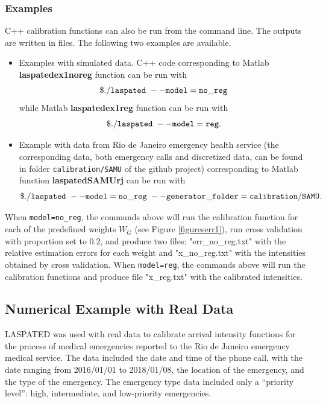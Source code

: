 \documentclass[article]{jss}
\begin{document}
{\begin{lstlisting}[label={list:13},caption=Cross validation in C++]
\end{lstlisting}



\subsubsection{Examples}

 C++ calibration functions can also be run from the command line. The outputs are written in files. The following two examples are available.

\begin{itemize}
    \item Examples with simulated data. C++ code corresponding to 
    Matlab \textbf{laspatedex1noreg} function can be run with
    $$
    {\tt{\$./laspated\text{ }--model=no\_reg}}
    $$
    while 
    Matlab \textbf{laspatedex1reg} function can be run with
    $$
    {\tt{\$./laspated\text{ }--model=reg.}}
    $$
    \item Example with data from Rio de Janeiro emergency health service (the corresponding
    data, both emergency calls and discretized
    data, can be found in folder {\tt{calibration/SAMU}} of the github project)
    corresponding to Matlab function 
    {\textbf{laspatedSAMUrj}} can be run
    with
    $$
    {\tt{\$./laspated\text{ }--model=no\_reg\text{ }--generator\_folder=calibration/SAMU}}.
    $$
\end{itemize}

When {\tt{model=no\_reg}}, the commands above will run the calibration function for each of the predefined weights  \(W_G\) (see Figure \ref{figureserr1}), run cross validation with proportion set to 0.2, and produce two files: "err\_no\_reg.txt" with the relative estimation errors for each weight and "x\_no\_reg.txt" with the intensities obtained by cross validation. When {\tt{model=reg}}, the commands above will run the calibration functions and produce  file "x\_reg.txt" with the calibrated intensities.
}


\subsection{Numerical Example with Real Data}
\label{sec:case-study}

LASPATED was used with real data to calibrate arrival intensity functions for the process of medical emergencies reported to the Rio de Janeiro emergency medical service.
The data included the date and time of the phone call, with the date ranging from 2016/01/01 to 2018/01/08, the location of the emergency, and the type of the emergency.
The emergency type data included only a ``priority level'': high, intermediate, and low-priority emergencies.
\end{document}
